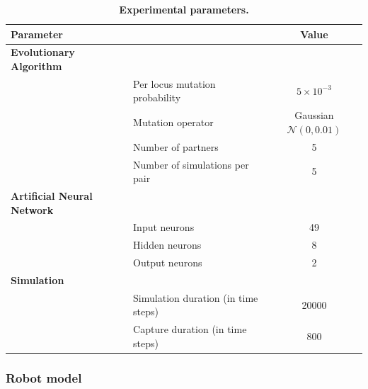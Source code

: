     \begin{table}[ht]
      \centerfloat
        \begin{tabular}{|l|l|c|}
          \hline
          \multicolumn{2}{|l|}{\textbf{Parameter}} & \textbf{Value} \\
          \hline
          \hline
          \textbf{Evolutionary Algorithm} & & \\
          \hline
          & Per locus mutation probability & \(5 \times 10^{-3}\) \\
          \hline
          & Mutation operator & Gaussian \(\mathcal{N}(0, 0.01)\) \\
          \hline
          & Number of partners & 5 \\
          \hline
          & Number of simulations per pair & 5 \\
          \hline

          \textbf{Artificial Neural Network} & & \\
          \hline
          & Input neurons & 49 \\
          \hline
          & Hidden neurons & 8 \\
          \hline
          & Output neurons & 2 \\
          \hline

          \textbf{Simulation} & & \\
          \hline
          & Simulation duration (in time steps) & 20000 \\
          \hline
          & Capture duration (in time steps) & 800 \\
          \hline
        \end{tabular}
        \caption{\textbf{Experimental parameters.}}
      \label{table:tableParameters}
    \end{table}

    \subsubsection{Robot model} 

